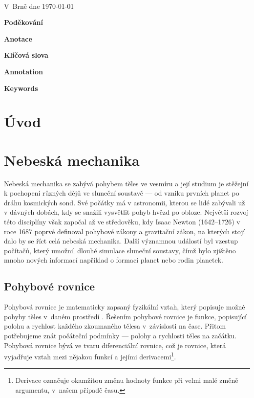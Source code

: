 \documentclass[A4paper, 12pt, oneside]{book}
\begin{document}
\

V~Brně dne \today\ \dotfill \hspace{10mm}

\newpage

{\large \bfseries Poděkování}

\newpage

{\large \bfseries Anotace}

{\large \bfseries Klíčová slova}

{\large \bfseries Annotation}

{\large \bfseries Keywords}

\newpage

\tableofcontents

\newpage %
\chapter{Úvod}
\pagestyle{headings}

\chapter{Nebeská mechanika}
Nebeská mechanika se zabývá pohybem těles ve vesmíru a její studium je stěžejní k pochopení různých dějů ve sluneční soustavě --- od vzniku prvních planet po dráhu kosmických sond. Své počátky má v astronomii, kterou se lidé zabývali už v dávných dobách, kdy se snažili vysvětlit pohyb hvězd po obloze. Největší rozvoj této disciplíny však započal až ve středověku, kdy Isaac Newton (1642--1726) v roce 1687 poprvé definoval pohybové zákony a gravitační zákon, na kterých stojí dalo by se říct celá nebeská mechanika. Další významnou událostí byl vzestup počítačů, který umožnil dlouhé simulace sluneční soustavy, čímž bylo zjištěno mnoho nových informací například o formaci planet nebo rodin planetek.

\section{Pohybové rovnice}
Pohybová rovnice je matematicky zapsaný fyzikální vztah, který popisuje možné pohyby těles v~daném prostředí \cite{wiki:eqm}. Řešením pohybové rovnice je funkce, popisující polohu a rychlost každého zkoumaného tělesa v~závislosti na čase. Přitom potřebujeme znát počáteční podmínky --- polohy a rychlosti těles na začátku. Pohybová rovnice bývá ve tvaru diferenciální rovnice, což je rovnice, která vyjadřuje vztah mezi nějakou funkcí a jejími derivacemi\footnote{Derivace označuje okamžitou změnu hodnoty funkce při velmi malé změně argumentu, v~našem případě času.}.
\end{document}

